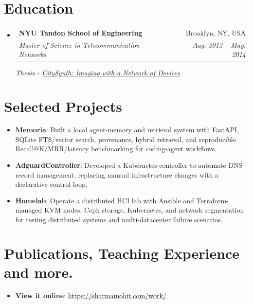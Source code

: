 \documentclass[letterpaper,11pt]{article}
\makeatletter
\newcommand{\resumeItem}[2]{
\item\small{
\textbf{#1}{: #2 \vspace{-2pt}}
}
}
\newcommand{\resumeSubheading}[4]{
\vspace{-1pt}\item
\begin{tabular*}{0.97\textwidth}[t]{l@{\extracolsep{\fill}}r}
    \textbf{#1}       & #2                 \\
    \textit{\small#3} & \textit{\small #4} \\
\end{tabular*}\vspace{-3pt}
}
\newcommand{\resumeSubItem}[2]{\resumeItem{#1}{#2}\vspace{-4pt}}
\newcommand{\resumeSubHeadingListStart}{\begin{itemize}[leftmargin=*]}
\newcommand{\resumeSubHeadingListEnd}{\end{itemize}}
\makeatother
\begin{document}
\section{\color[HTML]{DF691A} Education}
\resumeSubHeadingListStart
\resumeSubheading
{NYU Tandon School of Engineering}{Brooklyn, NY, USA}
{Master of Science in Telecommunication Networks}{Aug. 2012 -- May. 2014}
\textit{\small{Thesis - \href{https://sharmamohit.com/project/citysynth/}{CitySynth: Imaging with a Network of Devices}}}
\resumeSubHeadingListEnd

\section{\color[HTML]{DF691A} Selected Projects}
\resumeSubHeadingListStart
\resumeSubItem{Memoria}
{Built a local agent-memory and retrieval system with FastAPI, SQLite FTS/vector search, provenance, hybrid retrieval, and reproducible Recall@K/MRR/latency benchmarking for coding-agent workflows.}
\resumeSubItem{AdguardController}
{Developed a Kubernetes controller to automate DNS record management, replacing manual infrastructure changes with a declarative control loop.}
\resumeSubItem{Homelab}
{Operate a distributed HCI lab with Ansible and Terraform-managed KVM nodes, Ceph storage, Kubernetes, and network segmentation for testing distributed systems and multi-datacenter failure scenarios.}
\resumeSubHeadingListEnd

\section{\color[HTML]{DF691A} Publications, Teaching Experience and more.}
\resumeSubHeadingListStart
\resumeItem{View it online}{\href{https://sharmamohit.com/work/}{https://sharmamohit.com/work/}}
\newline
\resumeSubHeadingListEnd
\end{document}

